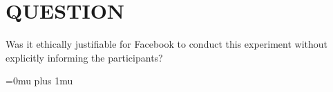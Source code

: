 \documentclass[12pt]{article}
\begin{document}


\thispagestyle{empty}
\pagestyle{plain}
\newpage
    \onecolumn
	\tableofcontents
\newpage

\setcounter{page}{1}
\twocolumn


\section{QUESTION}
Was it ethically justifiable for Facebook to conduct this experiment without explicitly informing the participants?
\vspace{0.4cm}










\newpage
\onecolumn
\Urlmuskip=0mu plus 1mu\relax
{}	




\newpage
\end{document}
